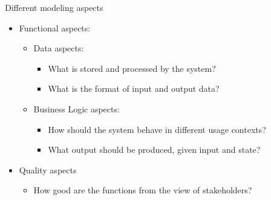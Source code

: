 
\begin{Slide}{Different modeling aspects }


\begin{itemize}
\item Functional aspects:
\begin{itemize}
\item Data aspects:
\begin{itemize}
\item What is stored and processed by the system?
\item What is the format of input and output data?

\end{itemize}
\item Business Logic aspects: 
\begin{itemize}
\item How should the system behave in different usage contexts?
\item What output should be produced, given input and state?  

\end{itemize}
\end{itemize}
\item Quality aspects
\begin{itemize}
\item How good are the functions from the view of stakeholders?

\end{itemize}
\end{itemize}
\end{Slide}